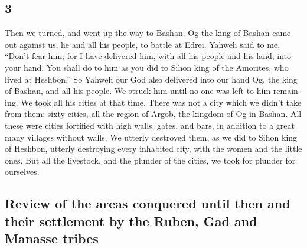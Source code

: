 \begin{paracol}{2}
\begin{otherlanguage}{english}
\hypertarget{section-5}{%
\section{3}\label{section-5}}

 Then we turned, and went up the way to Bashan. Og the
king of Bashan came out against us, he and all his people, to battle at
Edrei.  Yahweh said to me, ``Don't fear him; for I have
delivered him, with all his people and his land, into your hand. You
shall do to him as you did to Sihon king of the Amorites, who lived at
Heshbon.''  So Yahweh our God also delivered into our hand
Og, the king of Bashan, and all his people. We struck him until no one
was left to him remaining.  We took all his cities at that
time. There was not a city which we didn't take from them: sixty cities,
all the region of Argob, the kingdom of Og in Bashan.  All
these were cities fortified with high walls, gates, and bars, in
addition to a great many villages without walls.  We
utterly destroyed them, as we did to Sihon king of Heshbon, utterly
destroying every inhabited city, with the women and the little ones.
 But all the livestock, and the plunder of the cities, we
took for plunder for ourselves.

\hypertarget{review-of-the-areas-conquered-until-then-and-their-settlement-by-the-ruben-gad-and-manasse-tribes}{%
\subsection{Review of the areas conquered until then and their
settlement by the Ruben, Gad and Manasse
tribes}\label{review-of-the-areas-conquered-until-then-and-their-settlement-by-the-ruben-gad-and-manasse-tribes}}


\end{otherlanguage}
\end{paracol}
